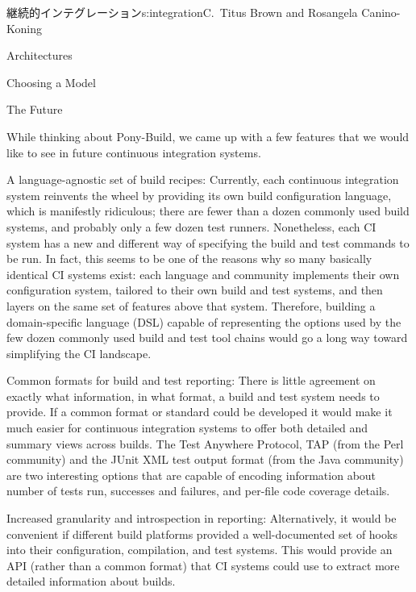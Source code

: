 \begin{aosachapter}{継続的インテグレーション}{s:integration}{C.\ Titus Brown and Rosangela Canino-Koning}
\begin{aosasect1}{Architectures}
\begin{aosasect2}{Choosing a Model}
\end{aosasect2}

\end{aosasect1}

\begin{aosasect1}{The Future}

While thinking about Pony-Build, we came up with a few features that
we would like to see in future continuous integration systems.

\begin{aosadescription}

  \item{A language-agnostic set of build recipes:} Currently,
  each continuous integration system reinvents the wheel by
  providing its own build configuration language, which is
  manifestly ridiculous; there are fewer than a dozen commonly used
  build systems, and probably only a few dozen test
  runners. Nonetheless, each CI system has a new and different way
  of specifying the build and test commands to be run. In fact, this
  seems to be one of the reasons why so many basically identical CI
  systems exist: each language and community implements their own
  configuration system, tailored to their own build and test
  systems, and then layers on the same set of features above that
  system. Therefore, building a domain-specific language (DSL)
  capable of representing the options used by the few dozen commonly
  used build and test tool chains would go a long way toward
  simplifying the CI landscape.

  \item{Common formats for build and test reporting:} There is
  little agreement on exactly what information, in what format, a
  build and test system needs to provide. If a common format or
  standard could be developed it would make it much easier for
  continuous integration systems to offer both detailed and summary
  views across builds. The Test Anywhere Protocol, TAP (from the
  Perl community) and the JUnit XML test output format (from the
  Java community) are two interesting options that are capable of
  encoding information about number of tests run, successes and
  failures, and per-file code coverage details.

  \item{Increased granularity and introspection in reporting:}
  Alternatively, it would be convenient if different build platforms
  provided a well-documented set of hooks into their configuration,
  compilation, and test systems. This would provide an API (rather
  than a common format) that CI systems could use to extract more
  detailed information about builds.


\end{aosadescription}
\end{aosasect1}
\end{aosachapter}
